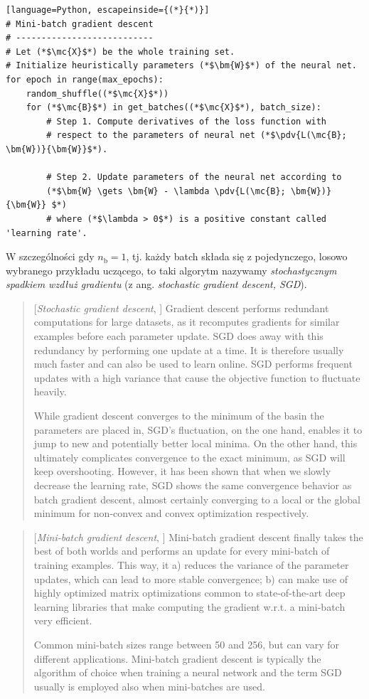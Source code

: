 \documentclass{myclass}
\numberwithin{equation}{subsection}
\begin{document}
\begin{lstlisting}[language=Python, escapeinside={(*}{*)}]
# Mini-batch gradient descent
# ---------------------------
# Let (*$\mc{X}$*) be the whole training set.
# Initialize heuristically parameters (*$\bm{W}$*) of the neural net.
for epoch in range(max_epochs):
    random_shuffle((*$\mc{X}$*))
    for (*$\mc{B}$*) in get_batches((*$\mc{X}$*), batch_size):
        # Step 1. Compute derivatives of the loss function with 
        # respect to the parameters of neural net (*$\pdv{L(\mc{B}; \bm{W})}{\bm{W}}$*).

        # Step 2. Update parameters of the neural net according to
        (*$\bm{W} \gets \bm{W} - \lambda \pdv{L(\mc{B}; \bm{W})}{\bm{W}} $*)
        # where (*$\lambda > 0$*) is a positive constant called 'learning rate'.
\end{lstlisting}

W szczególności gdy \(n_\text{b} = 1\), tj. każdy batch składa się z pojedynczego, losowo wybranego
przykładu uczącego, to taki algorytm nazywamy \emph{stochastycznym spadkiem wzdłuż gradientu} (z
ang. \textit{stochastic gradient descent, SGD}).

\begin{quote}[\textit{Stochastic gradient descent}, \cite{ruder2017overviewgradientdescentoptimization}]
Gradient descent performs redundant computations for large datasets, as it recomputes gradients for
similar examples before each parameter update. SGD does away with this redundancy by performing one
update at a time. It is therefore usually much faster and can also be used to learn online. SGD
performs frequent updates with a high variance that cause the objective function to fluctuate
heavily.

While gradient descent converges to the minimum of the basin the parameters are placed in, SGD's
fluctuation, on the one hand, enables it to jump to new and potentially better local minima. On the
other hand, this ultimately complicates convergence to the exact minimum, as SGD will keep
overshooting. However, it has been shown that when we slowly decrease the learning rate, SGD shows
the same convergence behavior as batch gradient descent, almost certainly converging to a local or
the global minimum for non-convex and convex optimization respectively.
\end{quote}
 
\begin{quote}[\textit{Mini-batch gradient descent}, \cite{ruder2017overviewgradientdescentoptimization}]
Mini-batch gradient descent finally takes the best of both worlds and performs an update for every
mini-batch of training examples. This way, it a) reduces the variance of the parameter updates,
which can lead to more stable convergence; b) can make use of highly optimized matrix optimizations
common to state-of-the-art deep learning libraries that make computing the gradient w.r.t. a
mini-batch very efficient.

Common mini-batch sizes range between 50 and 256, but can vary for different applications.
Mini-batch gradient descent is typically the algorithm of choice when training a neural network and
the term SGD usually is employed also when mini-batches are used.
\end{quote}
\end{document}
